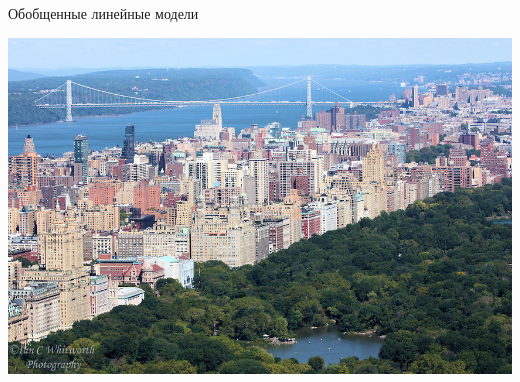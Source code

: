 \documentclass[aspectratio=169]{beamer}
\begin{document}
\begin{frame}{}

\begin{center}
\Large Обобщенные линейные модели

\vspace{1em}
\includegraphics[height=0.7\textheight]{images/central_park.jpg}
\end{center}

\end{frame}
\end{document}
